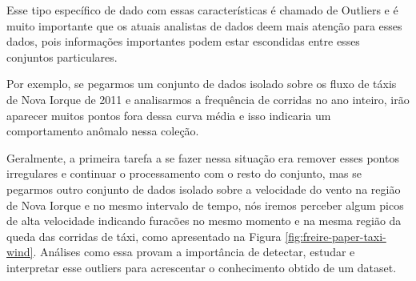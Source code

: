 
Esse tipo específico de dado com essas características é chamado de Outliers e é muito importante que os atuais analistas de dados deem mais atenção para esses dados, pois informações importantes podem estar escondidas entre esses conjuntos particulares.


Por exemplo, se pegarmos um conjunto de dados isolado sobre os fluxo de táxis de Nova Iorque de 2011 e analisarmos a frequência de corridas no ano inteiro, irão aparecer muitos pontos fora dessa curva média e isso indicaria um comportamento anômalo nessa coleção.


Geralmente, a primeira tarefa a se fazer nessa situação era remover esses pontos irregulares e continuar o processamento com o resto do conjunto, mas se pegarmos outro conjunto de dados isolado sobre a velocidade do vento na região de Nova Iorque e no mesmo intervalo de tempo, nós iremos perceber algum picos de alta velocidade indicando furacões no mesmo momento e na mesma região da queda das corridas de táxi, como apresentado na Figura \ref{fig:freire-paper-taxi-wind}. Análises como essa provam a importância de detectar, estudar e interpretar esse outliers para acrescentar o conhecimento obtido de um dataset.



